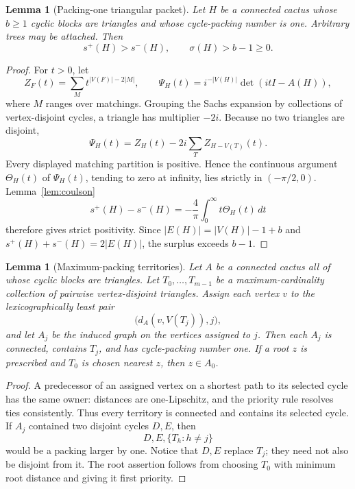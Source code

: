 \documentclass[11pt]{article}
\newtheorem{lemma}[theorem]{Lemma}
\theoremstyle{remark}
\newcommand{\splus}{s^+}
\newcommand{\sminus}{s^-}
\newcommand{\sig}{\sigma}
\begin{document}
\begin{lemma}[Packing-one triangular packet]\label{lem:packing-one}
Let $H$ be a connected cactus whose $b\geq1$ cyclic blocks are triangles and
whose cycle-packing number is one.  Arbitrary trees may be attached.  Then
\[
 \splus(H)>\sminus(H),\qquad \sig(H)>b-1\geq0.
\]
\end{lemma}

\begin{proof}
For $t>0$, let
\[
 Z_F(t)=\sum_M t^{|V(F)|-2|M|},
 \qquad
 \Psi_H(t)=i^{-|V(H)|}\det(itI-A(H)),
\]
where $M$ ranges over matchings.  Grouping the Sachs expansion by collections
of vertex-disjoint cycles, a triangle has multiplier $-2i$.  Because no two
triangles are disjoint,
\[
 \Psi_H(t)=Z_H(t)-2i\sum_T Z_{H-V(T)}(t).
\]
Every displayed matching partition is positive.  Hence the continuous
argument $\Theta_H(t)$ of $\Psi_H(t)$, tending to zero at infinity, lies
strictly in $(-\pi/2,0)$.  Lemma~\ref{lem:coulson}
\[
 \splus(H)-\sminus(H)
 =-\frac4\pi\int_0^\infty t\Theta_H(t)\,dt
\]
therefore gives strict positivity.  Since
$|E(H)|=|V(H)|-1+b$ and
$\splus(H)+\sminus(H)=2|E(H)|$, the surplus exceeds $b-1$.
\end{proof}

\begin{lemma}[Maximum-packing territories]\label{lem:voronoi}
Let $A$ be a connected cactus all of whose cyclic blocks are triangles.  Let
$T_0,\ldots,T_{m-1}$ be a maximum-cardinality collection of pairwise
vertex-disjoint triangles.  Assign each vertex $v$ to the lexicographically
least pair
\[
 \bigl(d_A(v,V(T_j)),j\bigr),
\]
and let $A_j$ be the induced graph on the vertices assigned to $j$.  Then each
$A_j$ is connected, contains $T_j$, and has cycle-packing number one.
If a root $z$ is prescribed and $T_0$ is chosen nearest $z$, then $z\in A_0$.
\end{lemma}

\begin{proof}
A predecessor of an assigned vertex on a shortest path to its selected cycle
has the same owner: distances are one-Lipschitz, and the priority rule resolves
ties consistently.  Thus every territory is connected and contains its
selected cycle.  If $A_j$ contained two disjoint cycles $D,E$, then
\[
 D,E,\{T_h:h\ne j\}
\]
would be a packing larger by one.  Notice that $D,E$ replace $T_j$; they need
not also be disjoint from it.  The root assertion follows from choosing $T_0$
with minimum root distance and giving it first priority.
\end{proof}
\end{document}
